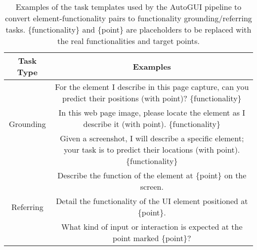 
\begin{table}[t]
\scriptsize
\centering
\caption{Examples of the task templates used by the AutoGUI pipeline to convert element-functionality pairs to functionality grounding/referring tasks. \{functionality\} and \{point\} are placeholders to be replaced with the real functionalities and target points.}
\label{tab:task templates}
\begin{tabular}{@{}cc@{}}
\toprule
Task Type & Examples \\ \midrule
\multirow{3}{*}{Grounding} & For the element I describe in this page capture, can you predict their positions (with point)? \{functionality\} \\
 & In this web page image, please locate the element as I describe it (with point). \{functionality\} \\
 & Given a screenshot, I will describe a specific element; your task is to predict their locations (with point). \{functionality\} \\ \midrule
\multirow{3}{*}{Referring} & Describe the function of the element at \{point\} on the screen. \\
 & Detail the functionality of the UI element positioned at \{point\}. \\
 & What kind of input or interaction is expected at the point marked \{point\}? \\ \bottomrule
\end{tabular}
\end{table}